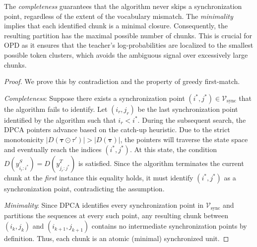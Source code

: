 \documentclass{article}
\theoremstyle{plain}
\theoremstyle{definition}
\theoremstyle{remark}
\begin{document}
The \textit{completeness} guarantees that the algorithm never skips a synchronization point, regardless of the extent of the vocabulary mismatch.  The \textit{minimality} implies that each identified chunk is a minimal closure. Consequently, the resulting partition has the maximal possible number of chunks. This is crucial for OPD as it ensures that the teacher's log-probabilities are localized to the smallest possible token clusters, which avoids the ambiguous signal over excessively large chunks.

\begin{proof}
We prove this by contradiction and the property of greedy first-match.

\textit{Completeness}: Suppose there exists a synchronization point $(i^*, j^*) \in \mathcal{V}_{\text{sync}}$ that the algorithm fails to identify. Let $(i_r, j_r)$ be the last synchronization point identified by the algorithm such that $i_r < i^*$. During the subsequent search, the DPCA pointers advance based on the catch-up heuristic. Due to the strict monotonicity $|D(\bm{\tau} \odot \tau')| > |D(\bm{\tau})|$, the pointers will traverse the state space and eventually reach the indices $(i^*, j^*)$. At this state, the condition $D(y^S_{i_r:i^*}) = D(y^T_{j_r:j^*})$ is satisfied. Since the algorithm terminates the current chunk at the \textit{first} instance this equality holds, it must identify $(i^*, j^*)$ as a synchronization point, contradicting the assumption.

\textit{Minimality}: Since DPCA identifies every synchronization point in $\mathcal{V}_{\text{sync}}$ and partitions the sequences at every such point, any resulting chunk between $(i_k, j_k)$ and $(i_{k+1}, j_{k+1})$ contains no intermediate synchronization points by definition. Thus, each chunk is an atomic (minimal) synchronized unit.
\end{proof}
\end{document}
